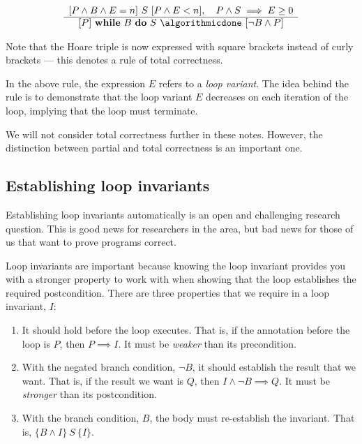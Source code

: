 \begin{displaymath}
 \begin{array}{c}
  [P \land B \land E = n] ~S~[P \land E < n],~~~ P \land S \implies E \geq 0  \\
 \hline
 [P]~ \algorithmicwhile~ B ~\algorithmicdo~ S ~ \algorithmicdone~[\neg B \land P]
 \end{array}
\end{displaymath}

Note that the Hoare triple is now expressed with square brackets instead of curly brackets --- this denotes a rule of total correctness.

In the above rule, the expression $E$ refers to a \emph{loop variant}. The idea behind the rule is to demonstrate that the loop variant $E$ decreases on each iteration of the loop, implying that the loop must terminate.

We will not consider total correctness further in these notes. However, the distinction between partial and total correctness is an important one.

\subsection{Establishing loop invariants}

Establishing loop invariants automatically is an open and challenging research question. This is good news for researchers in the area, but bad news for those of us that want to prove programs correct. 

Loop invariants are important because knowing the loop invariant provides you with a stronger property to work with when showing that the loop establishes the required postcondition. There are three properties that we require in a loop invariant, $I$:

\begin{enumerate}

 \item It should hold before the loop executes. That is, if the annotation before the loop is $P$, then $P \implies I$. It must be \emph{weaker} than its precondition.

 \item With the negated branch condition, $\neg B$, it should establish the result that we want. That is, if the result we want is $Q$, then $I \land \neg B \implies Q$. It must be \emph{stronger} than its postcondition.

 \item With the branch condition, $B$, the body must re-establish the invariant. That is, $\{B \land I\} ~S~ \{I\}$. 

\end{enumerate}

